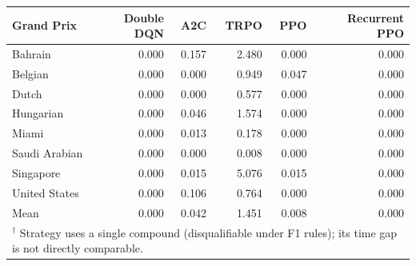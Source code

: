 \begin{tabular}{lrrrrr}
\toprule
Grand Prix & Double DQN & A2C & TRPO & PPO & Recurrent PPO \\
\midrule
Bahrain & 0.000 & 0.157 & 2.480 & 0.000 & 0.000 \\
Belgian & 0.000 & 0.000 & 0.949 & 0.047 & 0.000 \\
Dutch & 0.000 & 0.000 & 0.577 & 0.000 & 0.000 \\
Hungarian & 0.000 & 0.046 & 1.574 & 0.000 & 0.000 \\
Miami & 0.000 & 0.013 & 0.178 & 0.000 & 0.000 \\
Saudi Arabian & 0.000 & 0.000 & 0.008 & 0.000 & 0.000 \\
Singapore & 0.000 & 0.015 & 5.076 & 0.015 & 0.000 \\
United States & 0.000 & 0.106 & 0.764 & 0.000 & 0.000 \\
\midrule
Mean & 0.000 & 0.042 & 1.451 & 0.008 & 0.000 \\
\bottomrule
\multicolumn{6}{l}{\footnotesize $^\dagger$ Strategy uses a single compound (disqualifiable under F1 rules); its time gap is not directly comparable.} \\
\end{tabular}